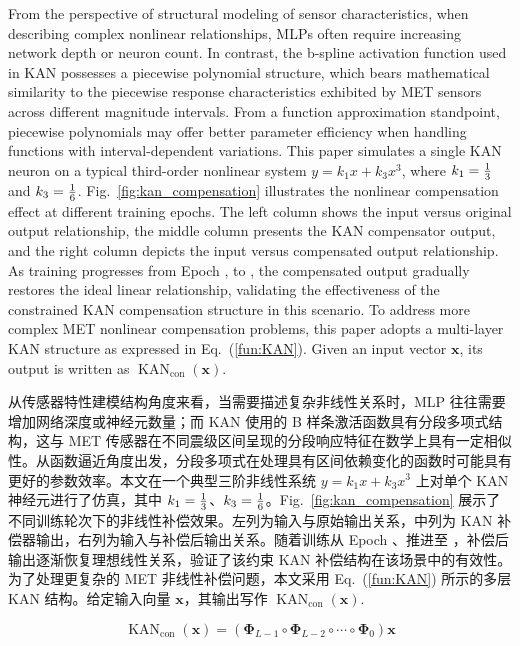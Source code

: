 \documentclass[sn-nature]{sn-jnl}
\newif\ifCNENEnglish
\newif\ifCNENBilingual
\newcommand{\CNEN}[2]{%
    \ifCNENBilingual
        #1%
        \if\relax\detokenize{#2}\relax\else\par #2\fi%
    \else
        \ifCNENEnglish
            #2%
        \else
            #1%
        \fi
    \fi
}
\begin{document}
\CNEN{从传感器特性建模结构角度来看，当需要描述复杂非线性关系时，MLP 往往需要增加网络深度或神经元数量；而 KAN 使用的 B 样条激活函数具有分段多项式结构，这与 MET 传感器在不同震级区间呈现的分段响应特征在数学上具有一定相似性。从函数逼近角度出发，分段多项式在处理具有区间依赖变化的函数时可能具有更好的参数效率。本文在一个典型三阶非线性系统 $y = k_1 x + k_3 x^3$ 上对单个 KAN 神经元进行了仿真，其中 $k_1 = \frac{1}{3}$、$k_3 = \frac{1}{6}$。Fig.~\ref{fig:kan_compensation} 展示了不同训练轮次下的非线性补偿效果。左列为输入与原始输出关系，中列为 KAN 补偿器输出，右列为输入与补偿后输出关系。随着训练从 Epoch \valKanExampleEpochA、\valKanExampleEpochB 推进至 \valKanExampleEpochC，补偿后输出逐渐恢复理想线性关系，验证了该约束 KAN 补偿结构在该场景中的有效性。为了处理更复杂的 MET 非线性补偿问题，本文采用 Eq.~(\ref{fun:KAN}) 所示的多层 KAN 结构。给定输入向量 $\mathbf{x}$，其输出写作 $\operatorname{KAN}_{\text{con}}(\mathbf{x})$.}{From the perspective of structural modeling of sensor characteristics, when describing complex nonlinear relationships, MLPs often require increasing network depth or neuron count. In contrast, the b-spline activation function used in KAN possesses a piecewise polynomial structure, which bears mathematical similarity to the piecewise response characteristics exhibited by MET sensors across different magnitude intervals. From a function approximation standpoint, piecewise polynomials may offer better parameter efficiency when handling functions with interval-dependent variations. This paper simulates a single KAN neuron on a typical third-order nonlinear system $y = k_1 x + k_3 x^3$, where $k_1 = \frac{1}{3}$ and $k_3 = \frac{1}{6}$. Fig.~\ref{fig:kan_compensation} illustrates the nonlinear compensation effect at different training epochs. The left column shows the input versus original output relationship, the middle column presents the KAN compensator output, and the right column depicts the input versus compensated output relationship. As training progresses from Epoch \valKanExampleEpochA, \valKanExampleEpochB to \valKanExampleEpochC, the compensated output gradually restores the ideal linear relationship, validating the effectiveness of the constrained KAN compensation structure in this scenario. To address more complex MET nonlinear compensation problems, this paper adopts a multi-layer KAN structure as expressed in Eq.~(\ref{fun:KAN}). Given an input vector $\mathbf{x}$, its output is written as $\operatorname{KAN}_{\text{con}}(\mathbf{x})$.%
}\begin{equation}
    \operatorname{KAN}_{\text{con}}(\mathbf{x}) = \left( \bm{\Phi}_{L-1} \circ \bm{\Phi}_{L-2} \circ \cdots \circ \bm{\Phi}_0 \right) \mathbf{x}
    \label{fun:KAN}
\end{equation}
\end{document}
